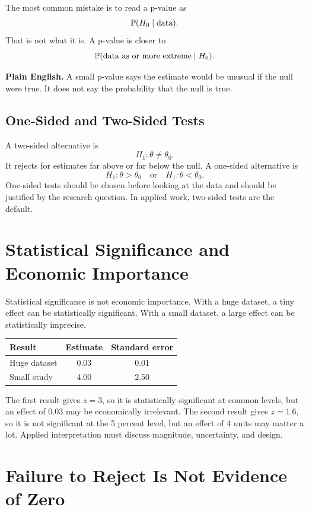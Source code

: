 The most common mistake is to read a p-value as
\[
  \mathbb{P}(H_0 \mid \text{data}).
\]
That is not what it is. A p-value is closer to
\[
  \mathbb{P}(\text{data as or more extreme} \mid H_0).
\]

\begin{boxF}
\textbf{Plain English.} A small p-value says the estimate would be unusual if
the null were true. It does not say the probability that the null is true.
\end{boxF}

\subsection{One-Sided and Two-Sided Tests}

A two-sided alternative is
\[
  H_1:\theta\neq\theta_0.
\]
It rejects for estimates far above or far below the null. A one-sided
alternative is
\[
  H_1:\theta>\theta_0
  \quad\text{or}\quad
  H_1:\theta<\theta_0.
\]
One-sided tests should be chosen before looking at the data and should be
justified by the research question. In applied work, two-sided tests are the
default.

\section{Statistical Significance and Economic Importance}

Statistical significance is not economic importance. With a huge dataset, a
tiny effect can be statistically significant. With a small dataset, a large
effect can be statistically imprecise.

\begin{center}
\begin{tabular}{lcc}
\toprule
Result & Estimate & Standard error \\
\midrule
Huge dataset & 0.03 & 0.01 \\
Small study & 4.00 & 2.50 \\
\bottomrule
\end{tabular}
\end{center}

The first result gives $z=3$, so it is statistically significant at common
levels, but an effect of $0.03$ may be economically irrelevant. The second
result gives $z=1.6$, so it is not significant at the 5 percent level, but an
effect of $4$ units may matter a lot. Applied interpretation must discuss
magnitude, uncertainty, and design.

\section{Failure to Reject Is Not Evidence of Zero}

